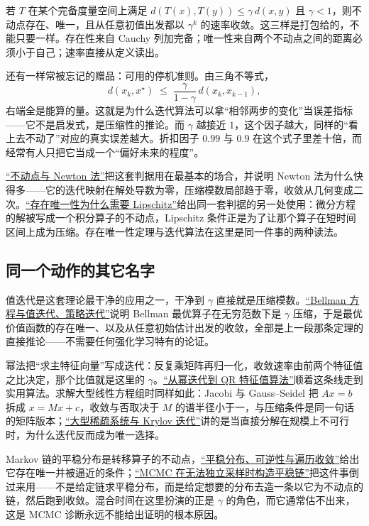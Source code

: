 若 \(T\) 在某个完备度量空间上满足 \(d(T(x),T(y)) \le \gamma\, d(x,y)\) 且 \(\gamma<1\)，则不动点存在、唯一，且从任意初值出发都以 \(\gamma^{k}\) 的速率收敛。这三样是打包给的，不能只要一样。存在性来自 Cauchy 列加完备；唯一性来自两个不动点之间的距离必须小于自己；速率直接从定义读出。

还有一样常被忘记的赠品：可用的停机准则。由三角不等式，
\[
  d(x_k, x^{\star}) \;\le\; \frac{\gamma}{1-\gamma}\, d(x_k, x_{k-1}),
\]
右端全是能算的量。这就是为什么迭代算法可以拿``相邻两步的变化''当误差指标——它不是启发式，是压缩性的推论。而 \(\gamma\) 越接近 \(1\)，这个因子越大，同样的``看上去不动了''对应的真实误差越大。折扣因子 \(0.99\) 与 \(0.9\) 在这个式子里差十倍，而经常有人只把它当成一个``偏好未来的程度''。

\hyperref[sec:08-Numerical-Analysis/02-Root-Finding/02]{``不动点与 Newton 法''}把这套判据用在最基本的场合，并说明 Newton 法为什么快得多——它的迭代映射在解处导数为零，压缩模数局部趋于零，收敛从几何变成二次。\hyperref[sec:15-Differential-Equations-and-Dynamical-Systems/01-ODE-Theory/03]{``存在唯一性为什么需要 Lipschitz''}给出同一套判据的另一处使用：微分方程的解被写成一个积分算子的不动点，Lipschitz 条件正是为了让那个算子在短时间区间上成为压缩。存在唯一性定理与迭代算法在这里是同一件事的两种读法。

\subsection{同一个动作的其它名字}

值迭代是这套理论最干净的应用之一，干净到 \(\gamma\) 直接就是压缩模数。\hyperref[sec:16-Control-and-Reinforcement-Learning/02-Reinforcement-Learning/02]{``Bellman 方程与值迭代、策略迭代''}说明 Bellman 最优算子在无穷范数下是 \(\gamma\) 压缩，于是最优价值函数的存在唯一、以及从任意初始估计出发的收敛，全部是上一段那条定理的直接推论——不需要任何强化学习特有的论证。

幂法把``求主特征向量''写成迭代：反复乘矩阵再归一化，收敛速率由前两个特征值之比决定，那个比值就是这里的 \(\gamma\)。\hyperref[sec:08-Numerical-Analysis/05-Numerical-Linear-Algebra/05]{``从幂迭代到 QR 特征值算法''}顺着这条线走到实用算法。求解大型线性方程组时同样如此：Jacobi 与 Gauss--Seidel 把 \(Ax=b\) 拆成 \(x = Mx + c\)，收敛与否取决于 \(M\) 的谱半径小于一，与压缩条件是同一句话的矩阵版本；\hyperref[sec:08-Numerical-Analysis/05-Numerical-Linear-Algebra/04]{``大型稀疏系统与 Krylov 迭代''}讲的是当直接分解在规模上不可行时，为什么迭代反而成为唯一选择。

Markov 链的平稳分布是转移算子的不动点，\hyperref[sec:06-Random-Processes/03-Markov-Chains/04]{``平稳分布、可逆性与遍历收敛''}给出它存在唯一并被逼近的条件；\hyperref[sec:13-Machine-Learning/08-Sampling-and-Inference/02]{``MCMC 在无法独立采样时构造平稳链''}把这件事倒过来用——不是给定链求平稳分布，而是给定想要的分布去造一条以它为不动点的链，然后跑到收敛。混合时间在这里扮演的正是 \(\gamma\) 的角色，而它通常估不出来，这是 MCMC 诊断永远不能给出证明的根本原因。

